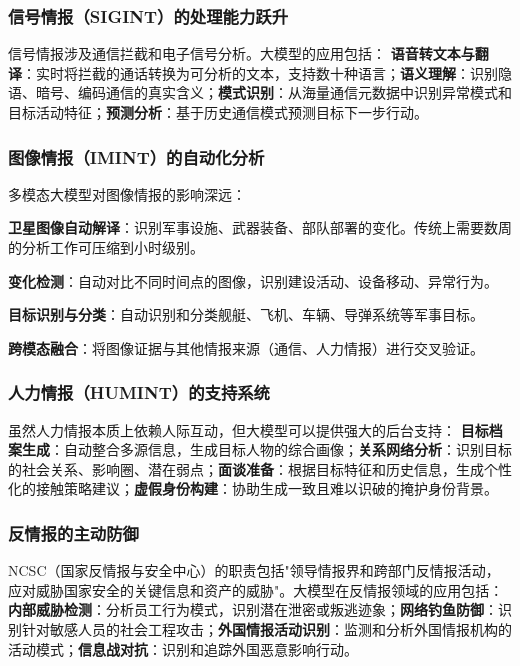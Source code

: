 \subsubsection{信号情报（SIGINT）的处理能力跃升}

信号情报涉及通信拦截和电子信号分析。大模型的应用包括：
\textbf{语音转文本与翻译}：实时将拦截的通话转换为可分析的文本，支持数十种语言；\textbf{语义理解}：识别隐语、暗号、编码通信的真实含义；\textbf{模式识别}：从海量通信元数据中识别异常模式和目标活动特征；\textbf{预测分析}：基于历史通信模式预测目标下一步行动。

\subsubsection{图像情报（IMINT）的自动化分析}

多模态大模型对图像情报的影响深远：

\textbf{卫星图像自动解译}：识别军事设施、武器装备、部队部署的变化。传统上需要数周的分析工作可压缩到小时级别。

\textbf{变化检测}：自动对比不同时间点的图像，识别建设活动、设备移动、异常行为。

\textbf{目标识别与分类}：自动识别和分类舰艇、飞机、车辆、导弹系统等军事目标。

\textbf{跨模态融合}：将图像证据与其他情报来源（通信、人力情报）进行交叉验证。

\subsubsection{人力情报（HUMINT）的支持系统}

虽然人力情报本质上依赖人际互动，但大模型可以提供强大的后台支持：
\textbf{目标档案生成}：自动整合多源信息，生成目标人物的综合画像；\textbf{关系网络分析}：识别目标的社会关系、影响圈、潜在弱点；\textbf{面谈准备}：根据目标特征和历史信息，生成个性化的接触策略建议；\textbf{虚假身份构建}：协助生成一致且难以识破的掩护身份背景。

\subsubsection{反情报的主动防御}

NCSC（国家反情报与安全中心）的职责包括"领导情报界和跨部门反情报活动，应对威胁国家安全的关键信息和资产的威胁"。大模型在反情报领域的应用包括：
\textbf{内部威胁检测}：分析员工行为模式，识别潜在泄密或叛逃迹象；\textbf{网络钓鱼防御}：识别针对敏感人员的社会工程攻击；\textbf{外国情报活动识别}：监测和分析外国情报机构的活动模式；\textbf{信息战对抗}：识别和追踪外国恶意影响行动。

